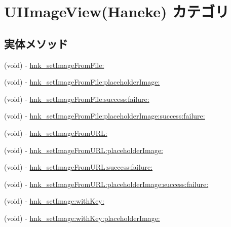 \hypertarget{category_u_i_image_view_07_haneke_08}{}\section{U\+I\+Image\+View(Haneke) カテゴリ}
\label{category_u_i_image_view_07_haneke_08}
\subsection*{実体メソッド}
\begin{DoxyCompactItemize}
\item 
(void) -\/ \hyperlink{category_u_i_image_view_07_haneke_08_a86ba76b10ac70fa03b50c12a48db2c13}{hnk\+\_\+set\+Image\+From\+File\+:}
\item 
(void) -\/ \hyperlink{category_u_i_image_view_07_haneke_08_a84d25eb022519cc692515a56d9386d0c}{hnk\+\_\+set\+Image\+From\+File\+:placeholder\+Image\+:}
\item 
(void) -\/ \hyperlink{category_u_i_image_view_07_haneke_08_ad2db18930a64ed9b0dcc03a0eca36d1c}{hnk\+\_\+set\+Image\+From\+File\+:success\+:failure\+:}
\item 
(void) -\/ \hyperlink{category_u_i_image_view_07_haneke_08_ababc9660954e936c7c868d5c7096265e}{hnk\+\_\+set\+Image\+From\+File\+:placeholder\+Image\+:success\+:failure\+:}
\item 
(void) -\/ \hyperlink{category_u_i_image_view_07_haneke_08_a95198a2847e770cee5ef3267826adbc3}{hnk\+\_\+set\+Image\+From\+U\+R\+L\+:}
\item 
(void) -\/ \hyperlink{category_u_i_image_view_07_haneke_08_ae37286f332e6c9a9d50c5ff227e63f03}{hnk\+\_\+set\+Image\+From\+U\+R\+L\+:placeholder\+Image\+:}
\item 
(void) -\/ \hyperlink{category_u_i_image_view_07_haneke_08_a5fc6aca5b75c3d2acee1cba15244b1ef}{hnk\+\_\+set\+Image\+From\+U\+R\+L\+:success\+:failure\+:}
\item 
(void) -\/ \hyperlink{category_u_i_image_view_07_haneke_08_a07cd81448897667b3a4595ab6720f61c}{hnk\+\_\+set\+Image\+From\+U\+R\+L\+:placeholder\+Image\+:success\+:failure\+:}
\item 
(void) -\/ \hyperlink{category_u_i_image_view_07_haneke_08_aa42af9d4986a31437d4152d0bfe939e0}{hnk\+\_\+set\+Image\+:with\+Key\+:}
\item 
(void) -\/ \hyperlink{category_u_i_image_view_07_haneke_08_a41695d8930c4035df1bfde9901828290}{hnk\+\_\+set\+Image\+:with\+Key\+:placeholder\+Image\+:}
\item 

\end{DoxyCompactItemize}
